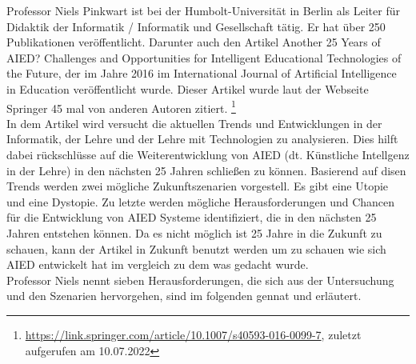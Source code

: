 
Professor Niels Pinkwart ist bei der Humbolt-Universität in Berlin als Leiter für \glqq{} Didaktik der Informatik / Informatik und Gesellschaft\grqq{} tätig. 
Er hat über 250 Publikationen veröffentlicht. Darunter auch den Artikel \glqq{} Another 25 Years of AIED? Challenges and Opportunities for Intelligent Educational Technologies of the Future\grqq{}, der im Jahre 2016 im \glqq International Journal of Artificial Intelligence in Education\grqq{} veröffentlicht wurde.
Dieser Artikel wurde laut der Webseite Springer 45 mal von anderen Autoren zitiert. \footnote{\url{https://link.springer.com/article/10.1007/s40593-016-0099-7}, zuletzt aufgerufen am 10.07.2022}
\\ \noindent
In dem Artikel wird versucht die aktuellen Trends und Entwicklungen in der Informatik, der Lehre und der Lehre mit Technologien zu analysieren. Dies hilft dabei rückschlüsse auf die Weiterentwicklung
von \ac{AIED} (dt. Künstliche Intellgenz in der Lehre) in den nächsten 25 Jahren schließen zu können. Basierend auf disen Trends werden zwei mögliche Zukunftszenarien vorgestell.
Es gibt eine Utopie und eine Dystopie. Zu letzte werden mögliche Herausforderungen und Chancen für die Entwicklung von \ac{AIED} Systeme identifiziert, die in den nächsten 25 Jahren entstehen können. 
Da es nicht möglich ist 25 Jahre in die Zukunft zu schauen, kann der Artikel in Zukunft benutzt werden um zu schauen wie sich \ac{AIED} entwickelt hat im vergleich zu dem was gedacht wurde. \cite[S. 1f]{Pinkwart.2016}
\\ \noindent
Professor Niels nennt sieben Herausforderungen, die sich aus der Untersuchung und den Szenarien hervorgehen, sind im folgenden gennat und erläutert.
